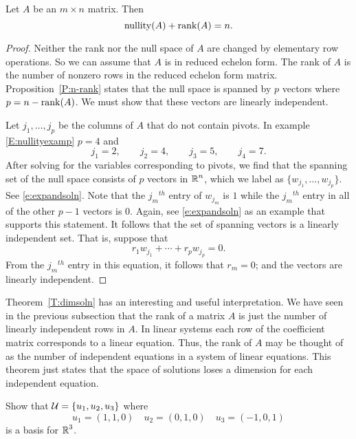 \documentclass{ximera}
\begin{document}
\begin{theorem}  \label{T:dimsoln}
Let $A$ be an $m\times n$ matrix. Then
\[
{\rm nullity}(A) + {\rm rank}(A) = n.
\]
\end{theorem} 

\begin{proof}	Neither the rank nor the null space of $A$ are changed by
elementary row operations.  So we can assume that $A$ is in reduced
echelon form.  The rank of $A$ is the number of nonzero rows in
the reduced echelon form matrix.  Proposition~\ref{P:n-rank} states that
the null space is spanned by $p$ vectors where $p=n-{\rm rank}(A)$.  We
must show that these vectors are linearly independent.

Let $j_1,\ldots,j_p$ be the columns of $A$ that do not contain pivots.
In example \eqref{E:nullityexamp} $p=4$ and
\[
j_1 = 2, \qquad j_2 = 4, \qquad j_3 = 5, \qquad j_4 = 7.
\]
After solving for the variables corresponding to pivots, we find that
the spanning set of the null space consists of $p$ vectors in $\mbox{$\Bbb{R}$}^n$,
which we label as $\{w_{j_1},\ldots,w_{j_p}\}$.  See \eqref{e:expandsoln}.
Note that the $j_m$$^{th}$  entry of $w_{j_m}$ is $1$ while the
$j_m$$^{th}$ entry in all of the other $p-1$ vectors is $0$.  Again,
see \eqref{e:expandsoln} as an example that supports this statement.  It
follows that the set of spanning vectors is a linearly independent set.
That is, suppose that
\[
r_1w_{j_1} + \cdots + r_pw_{j_p} = 0.
\]
From the $j_m$$^{th}$ entry in this equation, it follows that $r_m=0$;
and the vectors are linearly independent.  \end{proof}

Theorem~\ref{T:dimsoln} has an interesting and useful interpretation.
We have seen in the previous subsection that the rank of a matrix $A$
is just the number of linearly independent rows in $A$.
In linear systems each row of the coefficient matrix corresponds
to a linear equation.  Thus, the rank of $A$ may be thought of as the
number of independent equations in a system of linear equations.
This theorem just states that the space of solutions loses a dimension
for each independent equation.


\EXER

\TEXER

\begin{exercise} \label{c5.5.1}
Show that ${\cal U}=\{u_1,u_2,u_3\}$ where
\[
u_1=(1,1,0) \quad u_2=(0,1,0) \quad u_3=(-1,0,1)
\]
is a basis for $\mbox{$\Bbb{R}$}^3$.
\end{exercise}
\end{document}
